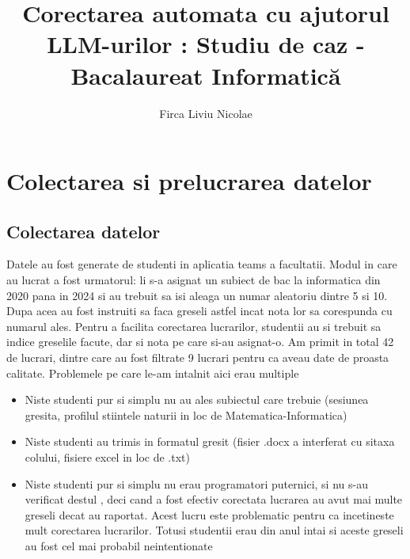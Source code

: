 \documentclass[12pt, a4paper]{report}
\title{Corectarea automata cu ajutorul LLM-urilor : Studiu de caz - Bacalaureat Informatică}
\author{Firca Liviu Nicolae}
\begin{document}
\cleardoublepage
\let\ps@plain


\restoregeometry
{}


\addtocounter{page}{1}



\tableofcontents

\cleardoublepage
\pagestyle{main}
\let\ps@plain\ps@main



\chapter{Colectarea si prelucrarea datelor}
\section{Colectarea datelor}
Datele au fost generate de studenti in aplicatia teams a facultatii. Modul in care au lucrat a fost urmatorul: li s-a asignat un subiect de bac la informatica din 2020 pana in 2024
si au trebuit sa isi aleaga un numar aleatoriu dintre 5 si 10. Dupa acea au fost instruiti sa faca greseli astfel incat nota lor sa corespunda cu numarul ales.
Pentru a facilita corectarea lucrarilor, studentii au si trebuit sa indice greselile facute, dar si nota pe care si-au asignat-o.
Am primit in total 42 de lucrari, dintre care au fost filtrate 9 lucrari pentru ca aveau date de proasta calitate.
Problemele pe care le-am intalnit aici erau multiple
\begin{itemize}
  \item Niste studenti pur si simplu nu au ales subiectul care trebuie (sesiunea gresita, profilul stiintele naturii in loc de Matematica-Informatica)
  \item Niste studenti au trimis in formatul gresit (fisier .docx a interferat cu sitaxa colului, fisiere excel in loc de .txt)
  \item Niste studenti pur si simplu nu erau programatori puternici, si nu s-au verificat destul , deci cand a fost efectiv corectata lucrarea au
  avut mai multe greseli decat au raportat. Acest lucru este problematic pentru ca incetineste mult corectarea lucrarilor. Totusi studentii erau din anul intai si aceste greseli au fost cel mai probabil neintentionate


\end{itemize} 
\end{document}
